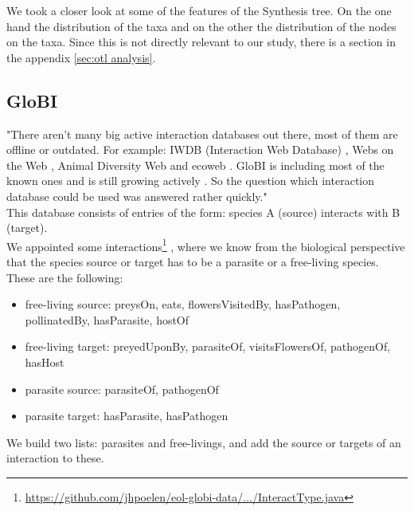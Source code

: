       We took a closer look at some of the features of the Synthesis tree. On the one hand the 
        distribution of the taxa and on the other the distribution of the nodes on the taxa. Since this
        is not directly relevant to our study, there is a section in the appendix \ref{sec:otl analysis}.

    \subsection{GloBI}
       "There aren't many big active interaction databases out there, most of them are 
        offline or outdated. For example: IWDB (Interaction Web Database) \cite{IWDB2003}, Webs on the 
        Web \cite{WOW2004}, Animal Diversity Web \cite{Myers2003} and ecoweb \cite{Cohen2010}. GloBI is 
        including most of the known ones and is still growing actively \cite{Poelen2014}. So the 
        question which interaction database could be used was answered rather quickly." \\

      This database consists of entries of the form: species A (source) interacts with B (target). \\
      We appointed some interactions\footnote{\hyperlink{
        https://github.com/jhpoelen/eol-globi-data/blob/master/eol-globi-lib/src/main/java/org/eol/globi/domain/InteractType.java
        }{https://github.com/jhpoelen/eol-globi-data/.../InteractType.java}}
        , where we know from the biological perspective that the species source or target has to be a 
        parasite or a free-living species. These are the following:
      \begin{itemize}
        \item free-living source: preysOn, eats, flowersVisitedBy, hasPathogen, pollinatedBy, 
          hasParasite, hostOf
        \item free-living target: preyedUponBy, parasiteOf, visitsFlowersOf, pathogenOf, hasHost
        \item parasite source: parasiteOf, pathogenOf
        \item parasite target: hasParasite, hasPathogen
      \end{itemize}
      We build two lists: parasites and free-livings, and add the source or targets of an interaction
        to these.

